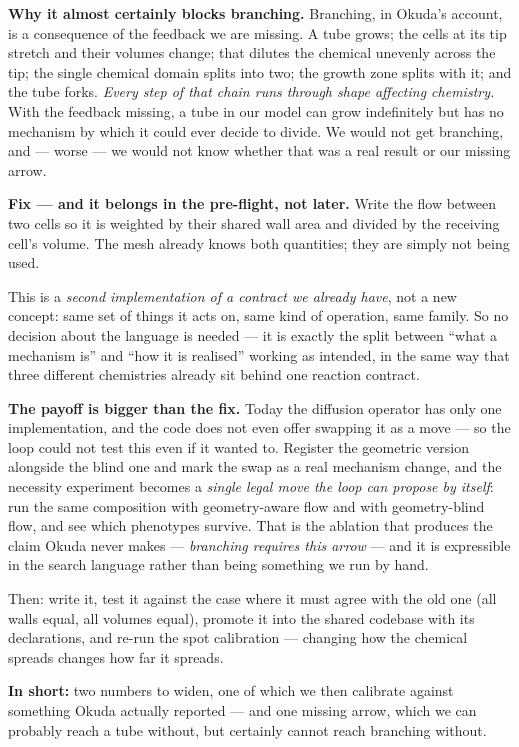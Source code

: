 \documentclass[11pt,a4paper]{article}
\begin{document}
\textbf{Why it almost certainly blocks branching.} Branching, in Okuda's account, is a consequence
of the feedback we are missing. A tube grows; the cells at its tip stretch and their volumes
change; that dilutes the chemical unevenly across the tip; the single chemical domain splits into
two; the growth zone splits with it; and the tube forks. \emph{Every step of that chain runs through
shape affecting chemistry.} With the feedback missing, a tube in our model can grow indefinitely but
has no mechanism by which it could ever decide to divide. We would not get branching, and --- worse
--- we would not know whether that was a real result or our missing arrow.

\textbf{Fix --- and it belongs in the pre-flight, not later.} Write the flow between two cells so
it is weighted by their shared wall area and divided by the receiving cell's volume. The mesh
already knows both quantities; they are simply not being used.

This is a \emph{second implementation of a contract we already have}, not a new concept: same set
of things it acts on, same kind of operation, same family. So no decision about the language is
needed --- it is exactly the split between ``what a mechanism is'' and ``how it is realised''
working as intended, in the same way that three different chemistries already sit behind one
reaction contract.

\textbf{The payoff is bigger than the fix.} Today the diffusion operator has only one
implementation, and the code does not even offer swapping it as a move --- so the loop could not
test this even if it wanted to. Register the geometric version alongside the blind one and mark
the swap as a real mechanism change, and the necessity experiment becomes a \emph{single legal
move the loop can propose by itself}: run the same composition with geometry-aware flow and with
geometry-blind flow, and see which phenotypes survive. That is the ablation that produces the claim
Okuda never makes --- \emph{branching requires this arrow} --- and it is expressible in the search
language rather than being something we run by hand.

Then: write it, test it against the case where it must agree with the old one (all walls equal, all
volumes equal), promote it into the shared codebase with its declarations, and re-run the spot
calibration --- changing how the chemical spreads changes how far it spreads.

\medskip
\textbf{In short:} two numbers to widen, one of which we then calibrate against something Okuda
actually reported --- and one missing arrow, which we can probably reach a tube without, but
certainly cannot reach branching without.
\end{document}

